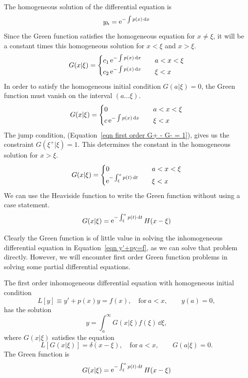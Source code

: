The homogeneous solution of the differential equation is
\[
y_h = \mathop{\mathrm{e}}\nolimits^{-\int p(x) \,\mathrm{d} x}
\]
Since the Green function satisfies the 
homogeneous equation for $x \neq \xi$, it will be a constant times this
homogeneous solution for $x < \xi$ and $x > \xi$.
\[
G(x|\xi) = 
\begin{cases}
  c_1 \mathop{\mathrm{e}}\nolimits^{-\int p(x) \,\mathrm{d} x} \quad &a < x < \xi \\
  c_2 \mathop{\mathrm{e}}\nolimits^{-\int p(x) \,\mathrm{d} x} \quad &\xi < x
\end{cases}
\]
In order to satisfy the homogeneous initial condition $G(a|\xi) = 0$, the 
Green function must vanish on the interval $(a \ldots \xi)$.
\[
G(x|\xi) = 
\begin{cases}
  0 \quad &a < x < \xi \\
  c \mathop{\mathrm{e}}\nolimits^{-\int p(x) \,\mathrm{d} x} \quad &\xi < x
\end{cases}
\]
The jump condition, (Equation~\ref{eqn first order G+ - G- = 1}), 
gives us the constraint $G(\xi^+|\xi) = 1$.  This determines the constant in 
the homogeneous solution for $x > \xi$.
\[
G(x|\xi) = 
\begin{cases}
  0 \quad &a < x < \xi \\
  \mathop{\mathrm{e}}\nolimits^{-\int_\xi^x p(t) \,\mathrm{d} t} \quad &\xi < x
\end{cases}
\]
We can use the Heaviside function to write the Green function without using 
a case statement.
\[
G(x|\xi) = \mathop{\mathrm{e}}\nolimits^{-\int_\xi^x p(t) \,\mathrm{d} t} H(x-\xi)
\]


Clearly the Green function is of little value in solving the inhomogeneous
differential equation in Equation~\ref{eqn y'+py=f}, as we can solve that
problem directly.  However, we will encounter first order Green function
problems in solving some partial differential equations.



\begin{Result}
  The first order inhomogeneous differential equation with homogeneous 
  initial condition
  \[ 
  L[y] \equiv y' + p(x) y = f(x), \quad \mathrm{for}\ a < x,
  \qquad y(a) = 0,
  \]
  has the solution
  \[ 
  y = \int_a^\infty G(x|\xi)f(\xi)\,\dd \xi,
  \]
  where $G(x|\xi)$ satisfies the equation
  \[ 
  L[G(x|\xi)] = \delta(x-\xi), \quad \mathrm{for}\ a<x, \qquad
  G(a|\xi) = 0.
  \]
  The Green function is
  \[
  G(x|\xi) = \mathop{\mathrm{e}}\nolimits^{-\int_\xi^x p(t) \,\mathrm{d} t} H(x-\xi)
  \]
\end{Result}














